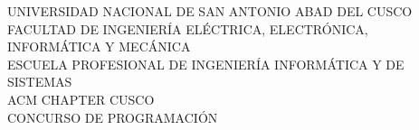 \begin{center}
    \large
    UNIVERSIDAD NACIONAL DE SAN ANTONIO ABAD DEL CUSCO\\
    \vspace{0.3cm}
    FACULTAD DE INGENIERÍA ELÉCTRICA, ELECTRÓNICA, INFORMÁTICA Y MECÁNICA\\
    \vspace{0.3cm}
    ESCUELA PROFESIONAL DE INGENIERÍA INFORMÁTICA Y DE SISTEMAS\\
    \vspace{2cm}
    ACM CHAPTER CUSCO\\
    \vspace{2cm}
    \Large
    CONCURSO DE PROGRAMACIÓN\\
    \vspace{0.5cm}
    \Huge{\textbf{\cuscontestName}}\\
    \Large
    \vspace{0.5cm}
    \iftoggle{solution}{\textit{PROBLEMSET CON SOLUCIONES}}{\textit{PROBLEMSET}}
    \\
    \vspace{3cm}
    \large
    \cuscontestDate\\
    \vspace{3cm}
    \cuscontestProblemset
\end{center}
